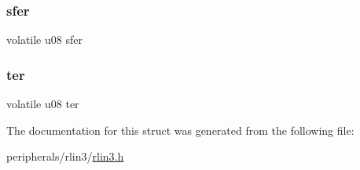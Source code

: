 \mbox{\label{structrlin3__lest__lin_a2607735d128ad2fa92372c21df1a3117}} 
\subsubsection{\texorpdfstring{sfer}{sfer}}
{\footnotesize\ttfamily volatile u08 sfer}

\mbox{\label{structrlin3__lest__lin_a1f8960ec8dc96b0318949554c2b8bbb7}} 
\subsubsection{\texorpdfstring{ter}{ter}}
{\footnotesize\ttfamily volatile u08 ter}



The documentation for this struct was generated from the following file\+:\begin{DoxyCompactItemize}
\item 
peripherals/rlin3/\mbox{\hyperlink{rlin3_8h}{rlin3.\+h}}\end{DoxyCompactItemize}
